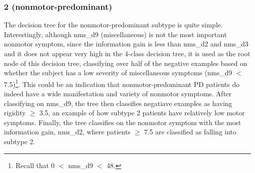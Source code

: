 \documentclass[10pt]{article}
\begin{document}
\subsubsection{2 (nonmotor-predominant)}
The decision tree for the nonmotor-predominant subtype is quite simple.
Interestingly, although nms\_d9 (miscellaneous) is not the most important
nonmotor symptom, since the information gain is less than nms\_d2 and nms\_d3
and it does not appear very high in the 4-class decision tree, it is used as
the root node of this decision tree, classifying over half of the negative
examples based on whether the subject has a low severity of miscellaneous
symptoms (nms\_d9 $<$ 7.5)\footnote{Recall that 0 $<$ nms\_d9 $<$ 48.}. This could be an indication that nonmotor-predominant PD patients do
indeed have a wide manifestation and variety of nonmotor symptoms. After
classifying on nms\_d9, the tree then classifies negatiave examples as having
rigidity $\geq$ 3.5, an example of how subtype 2 patients have relatively low motor
symptoms. Finally, the tree classifies on the nonmotor symptom with the most
information gain, nms\_d2, where patients $\geq$ 7.5 are classified as falling into
subtype 2.


\end{document}
